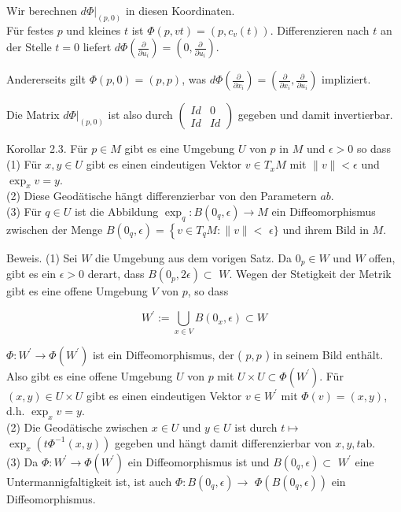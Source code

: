 \documentclass[10pt]{article}
\begin{document}
Wir berechnen $\left.d \Phi\right|_{(p, 0)}$ in diesen Koordinaten.\\
Für festes $p$ und kleines $t$ ist $\Phi(p, v t)=\left(p, c_{v}(t)\right)$. Differenzieren nach $t$ an der Stelle $t=0$ liefert $d \Phi\left(\frac{\partial}{\partial u_{i}}\right)=\left(0, \frac{\partial}{\partial u_{i}}\right)$.

Andererseits gilt $\Phi(p, 0)=(p, p)$, was $d \Phi\left(\frac{\partial}{\partial x_{i}}\right)=\left(\frac{\partial}{\partial x_{i}}, \frac{\partial}{\partial u_{i}}\right)$ impliziert.

Die Matrix $\left.d \Phi\right|_{(p, 0)}$ ist also durch $\left(\begin{array}{cc}I d & 0 \\ I d & I d\end{array}\right)$ gegeben und damit invertierbar.

Korollar 2.3. Für $p \in M$ gibt es eine Umgebung $U$ von $p$ in $M$ und $\epsilon>0$ so dass\\
(1) Für $x, y \in U$ gibt es einen eindeutigen Vektor $v \in T_{x} M$ mit $\|v\|<\epsilon$ und $\exp _{x} v=y$.\\
(2) Diese Geodätische hängt differenzierbar von den Parametern $a b$.\\
(3) Für $q \in U$ ist die Abbildung $\exp _{q}: B\left(0_{q}, \epsilon\right) \rightarrow M$ ein Diffeomorphismus zwischen der Menge $B\left(0_{q}, \epsilon\right)=\left\{v \in T_{q} M:\|v\|<\right.$ $\epsilon\}$ und ihrem Bild in $M$.

Beweis. (1) Sei $W$ die Umgebung aus dem vorigen Satz. Da $0_{p} \in W$ und $W$ offen, gibt es ein $\epsilon>0$ derart, dass $B\left(0_{p}, 2 \epsilon\right) \subset$ $W$. Wegen der Stetigkeit der Metrik gibt es eine offene Umgebung $V$ von $p$, so dass

$$
W^{\prime}:=\bigcup_{x \in V} B\left(0_{x}, \epsilon\right) \subset W
$$

$\Phi: W^{\prime} \rightarrow \Phi\left(W^{\prime}\right)$ ist ein Diffeomorphismus, der ( $p, p$ ) in seinem Bild enthält. Also gibt es eine offene Umgebung $U$ von $p$ mit $U \times U \subset \Phi\left(W^{\prime}\right)$. Für $(x, y) \in U \times U$ gibt es einen eindeutigen Vektor $v \in W^{\prime}$ mit $\Phi(v)=(x, y)$, d.h. $\exp _{x} v=y$.\\
(2) Die Geodätische zwischen $x \in U$ und $y \in U$ ist durch $t \mapsto$ $\exp _{x}\left(t \Phi^{-1}(x, y)\right)$ gegeben und hängt damit differenzierbar von $x, y, t \mathrm{ab}$.\\
(3) Da $\Phi: W^{\prime} \rightarrow \Phi\left(W^{\prime}\right)$ ein Diffeomorphismus ist und $B\left(0_{q}, \epsilon\right) \subset$ $W^{\prime}$ eine Untermannigfaltigkeit ist, ist auch $\Phi: B\left(0_{q}, \epsilon\right) \rightarrow$ $\Phi\left(B\left(0_{q}, \epsilon\right)\right)$ ein Diffeomorphismus.
\end{document}
